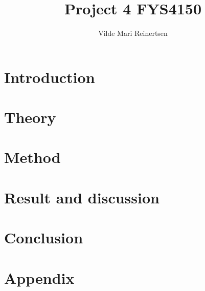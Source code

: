

\title{Project 4 FYS4150}
\author{Vilde Mari Reinertsen}
\raggedbottom



\maketitle

\begin{abstract}


\tableofcontents
\end{abstract}

\twocolumn

\section{Introduction}


\section{Theory}


\section{Method}


\section{Result and discussion}


%

\section{Conclusion}

\newpage



\onecolumn
\newpage

\section*{Appendix}




